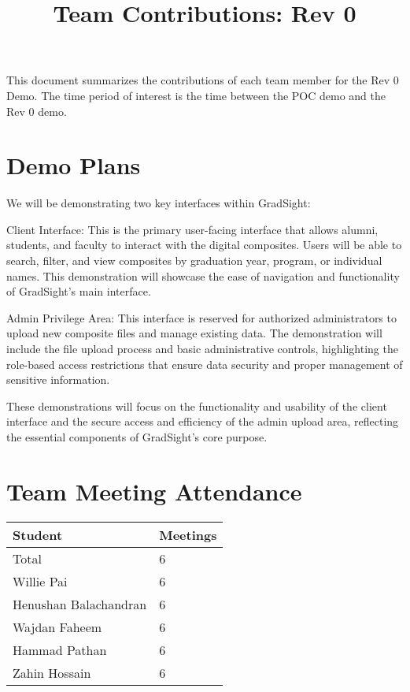 \documentclass{article}
\title{Team Contributions: Rev 0\\\progname}
\author{\authname}
\date{}
\begin{document}
\maketitle

This document summarizes the contributions of each team member for the Rev 0
Demo.  The time period of interest is the time between the POC demo and the Rev
0 demo.

\section{Demo Plans}

We will be demonstrating two key interfaces within GradSight:

Client Interface: This is the primary user-facing interface that allows alumni, students, and faculty to interact with the digital composites. Users will be able to search, filter, and view composites by graduation year, program, or individual names. This demonstration will showcase the ease of navigation and functionality of GradSight’s main interface.

Admin Privilege Area: This interface is reserved for authorized administrators to upload new composite files and manage existing data. The demonstration will include the file upload process and basic administrative controls, highlighting the role-based access restrictions that ensure data security and proper management of sensitive information.

These demonstrations will focus on the functionality and usability of the client interface and the secure access and efficiency of the admin upload area, reflecting the essential components of GradSight’s core purpose.

\section{Team Meeting Attendance}


\begin{table}[H]
\centering
\begin{tabular}{ll}
\toprule
\textbf{Student} & \textbf{Meetings}\\
\midrule
Total & 6\\
Willie Pai & 6\\
Henushan Balachandran & 6\\
Wajdan Faheem & 6\\
Hammad Pathan & 6\\
Zahin Hossain & 6\\
\bottomrule
\end{tabular}
\end{table}
\end{document}
